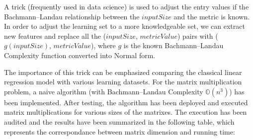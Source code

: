 A trick (frequently used in data science) is used to adjust the entry values if the Bachmann–Landau relationship between the $inputSize$ and the metric is known. In order to adjust the learning set to a more knowledgeable set, we can extract new features and replace all the ($inputSize$, $metricValue$) pairs with ($g(inputSize)$, $metricValue$), where $g$ is the known Bachmann–Landau Complexity function converted into Normal form.


The importance of this trick can be emphasized comparing the classical linear regression model with various learning datasets. For the matrix multiplication problem, a naive algorithm (with Bachmann–Landau Complexity $\mathbb{O}(n^{3})$) has been implemented. After testing, the algorithm has been deployed and executed matrix multiplications for various sizes of the matrixes. The execution has been audited and the results have been summarized in the following table, which represents the correspondance between matrix dimension and running time:

